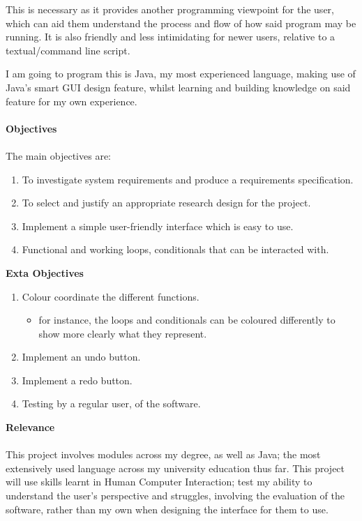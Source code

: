 \documentclass[a4paper, 12pt]{article}
\begin{document}
            This is necessary as it provides another programming viewpoint for the user,
            which can aid them understand the process and flow of how said program may be running.
            It is also friendly and less intimidating for newer users, relative to a textual/command
            line script.
                
            I am going to program this is Java, my most experienced language, making use of Java's
            smart GUI design feature, whilst learning and building knowledge on said feature for my
            own experience. \\\\
            \textbf{Objectives} \\\\
            The main objectives are:
            \begin{enumerate}
                \item To investigate system requirements and produce a requirements specification.
                \item To select and justify an appropriate research design for the project.
                \item Implement a simple user-friendly interface which is easy to use.
                \item Functional and working loops, conditionals that can be interacted
                with. \\
            \end{enumerate}        
            \textbf{Exta Objectives}
            \begin{enumerate}
                \item Colour coordinate the different functions.
                \begin{itemize}
                    \item for instance, the loops and conditionals can be coloured differently to show more
                    clearly what they represent.
                \end{itemize}
                \item Implement an undo button.
                \item Implement a redo button.
                \item Testing by a regular user, of the software.
            \end{enumerate}
            \textbf{Relevance} \\\\
            This project involves modules across my degree, as well as Java; the most extensively
            used language across my university education thus far. This project will use skills learnt
            in Human Computer Interaction; test my ability to understand the user's perspective and
            struggles, involving the evaluation of the software, rather than my own when designing
            the interface for them to use.
        
\end{document}
